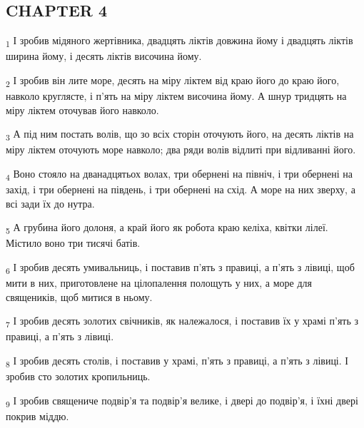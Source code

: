 \subsection{CHAPTER 4}
\begin{tcolorbox}
\textsubscript{1} І зробив мідяного жертівника, двадцять ліктів довжина йому і двадцять ліктів ширина йому, і десять ліктів височина йому.
\end{tcolorbox}
\begin{tcolorbox}
\textsubscript{2} І зробив він лите море, десять на міру ліктем від краю його до краю його, навколо круглясте, і п'ять на міру ліктем височина йому. А шнур тридцять на міру ліктем оточував його навколо.
\end{tcolorbox}
\begin{tcolorbox}
\textsubscript{3} А під ним постать волів, що зо всіх сторін оточують його, на десять ліктів на міру ліктем оточують море навколо; два ряди волів відлиті при відливанні його.
\end{tcolorbox}
\begin{tcolorbox}
\textsubscript{4} Воно стояло на дванадцятьох волах, три обернені на північ, і три обернені на захід, і три обернені на південь, і три обернені на схід. А море на них зверху, а всі зади їх до нутра.
\end{tcolorbox}
\begin{tcolorbox}
\textsubscript{5} А грубина його долоня, а край його як робота краю келіха, квітки лілеї. Містило воно три тисячі батів.
\end{tcolorbox}
\begin{tcolorbox}
\textsubscript{6} І зробив десять умивальниць, і поставив п'ять з правиці, а п'ять з лівиці, щоб мити в них, приготовлене на цілопалення полощуть у них, а море для священиків, щоб митися в ньому.
\end{tcolorbox}
\begin{tcolorbox}
\textsubscript{7} І зробив десять золотих свічників, як належалося, і поставив їх у храмі п'ять з правиці, а п'ять з лівиці.
\end{tcolorbox}
\begin{tcolorbox}
\textsubscript{8} І зробив десять столів, і поставив у храмі, п'ять з правиці, а п'ять з лівиці. І зробив сто золотих кропильниць.
\end{tcolorbox}
\begin{tcolorbox}
\textsubscript{9} І зробив священиче подвір'я та подвір'я велике, і двері до подвір'я, і їхні двері покрив міддю.
\end{tcolorbox}
